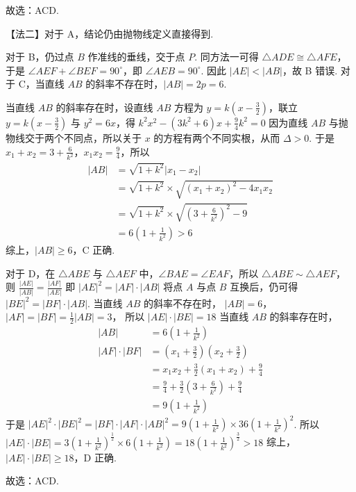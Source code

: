 \begin{solution}
故选：ACD.

【法二】对于 A，结论仍由抛物线定义直接得到.

对于 B，仍过点 \(B\) 作准线的垂线，交于点 \(P\). 同方法一可得 \(\triangle ADE \cong \triangle AFE\)，于是 \(\angle AEF + \angle BEF = 90^\circ\)，即 \(\angle AEB = 90^\circ\). 因此 \(|AE| < |AB|\)，故 B 错误.
对于 C，当直线 \(AB\) 的斜率不存在时，\(|AB| = 2p = 6\).

当直线 \(AB\) 的斜率存在时，设直线 \(AB\) 方程为 \(y = k \left(x - \frac{3}{2}\right)\)，联立 \(y = k \left(x - \frac{3}{2}\right)\) 与 \(y^2 = 6x\)，得
\(k^2 x^2 - (3k^2 + 6)x + \frac{9}{4}k^2 = 0\)
因为直线 \(AB\) 与抛物线交于两个不同点，所以关于 \(x\) 的方程有两个不同实根，从而 \(\Delta > 0\). 于是 \(x_1 + x_2 = 3 + \frac{6}{k^2}\)，\(x_1 x_2 = \frac{9}{4}\)，所以
\begin{align*}
|AB| &= \sqrt{1 + k^2}|x_1 - x_2|\\
&= \sqrt{1 + k^2} \times \sqrt{(x_1 + x_2)^2 - 4x_1 x_2}\\
&= \sqrt{1 + k^2} \times \sqrt{\left(3 + \frac{6}{k^2}\right)^2 - 9}\\
&= 6 \left(1 + \frac{1}{k^2}\right) > 6
\end{align*}
综上，\(|AB| \ge 6\)，C 正确.

对于 D，在 \(\triangle ABE\) 与 \(\triangle AEF\) 中，\(\angle BAE = \angle EAF\)，所以 \(\triangle ABE \sim \triangle AEF\)，则
\(\frac{|AE|}{|AB|} = \frac{|AF|}{|AE|}\)
即
\(
|AE|^2=|AF| \cdot |AB|
\)
将点 \(A\) 与点 \(B\) 互换后，仍可得 \( |BE|^2 = |BF| \cdot |AB| \). 当直线 \(AB\) 的斜率不存在时，
\(|AB|=6\)，\(|AF|=|BF|=\frac{1}{2} |AB|=3\)，
所以
\(
|AE| \cdot |BE|=18
\)
当直线 \(AB\) 的斜率存在时，
\begin{align*}
|AB| &= 6 \left(1 + \frac{1}{k^2}\right)\\
|AF| \cdot |BF|
&= \left(x_1 + \frac{3}{2}\right)\left(x_2 + \frac{3}{2}\right)\\
&= x_1 x_2 + \frac{3}{2}(x_1 + x_2) + \frac{9}{4}\\
&= \frac{9}{4} + \frac{3}{2}\left(3 + \frac{6}{k^2}\right) + \frac{9}{4}\\
&= 9 \left(1 + \frac{1}{k^2}\right)
\end{align*}
于是 \(|AE|^2 \cdot |BE|^2 = |BF| \cdot |AF| \cdot |AB|^2 = 9 \left(1 + \frac{1}{k^2}\right) \times 36 \left(1 + \frac{1}{k^2}\right)^2\).
所以
\(
|AE| \cdot |BE|=3 \left(1 + \frac{1}{k^2}\right)^{\frac{1}{2}} \times 6 \left(1 + \frac{1}{k^2}\right)=18 \left(1 + \frac{1}{k^2}\right)^{\frac{3}{2}}>18
\)
综上，\(|AE| \cdot |BE| \ge 18\)，D 正确.

故选：ACD.
\end{solution}

